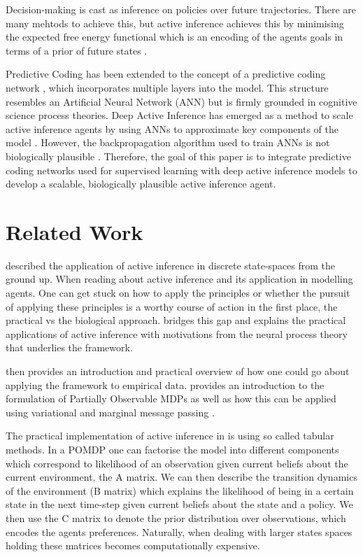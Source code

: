 \documentclass{article}
\begin{document}
Decision-making is cast as inference on policies over future trajectories. There are many mehtods to achieve this, but active inference achieves this by minimising the expected free energy functional which is an encoding of the agents goals in terms of a prior of future states \citep{friston2020relationship}. 

\vspace{1em}

Predictive Coding has been extended to the concept of a predictive coding network \citep{whittington2017approximation, bogacz2017tutorial, millidge2019implementing}, which incorporates multiple layers into the model. This structure resembles an Artificial Neural Network (ANN) but is firmly grounded in cognitive science process theories. Deep Active Inference has emerged as a method to scale active inference agents by using ANNs to approximate key components of the model \citep{millidge2020deep, fountas2020deep, himst2020deep}. However, the backpropagation algorithm used to train ANNs is not biologically plausible \citep{ororbia2024review}. Therefore, the goal of this paper is to integrate predictive coding networks used for supervised learning with deep active inference models to develop a scalable, biologically plausible active inference agent.

\section{Related Work}

\citet{dacosta2020active} described the application of active inference in discrete state-spaces from the ground up. When reading about active inference and its application in modelling agents. One can get stuck on how to apply the principles or whether the pursuit of applying these principles is a worthy course of action in the first place, the practical vs the biological approach. \citet{dacosta2020active} bridges this gap and explains the practical applications of active inference with motivations from the neural process theory that underlies the framework. 

\citet{smith2022} then provides an introduction and practical overview of how one could go about applying the framework to empirical data. \citet{smith2022} provides an introduction to the formulation of Partially Observable MDPs as well as how this can be applied using variational \citep{winn2005variational} and marginal message passing \citep{parr2019neuronal}.

The practical implementation of active inference in \citet{smith2022} is using so called tabular methods. In a POMDP one can factorise the model into different components which correspond to likelihood of an observation given current beliefs about the current environment, the A matrix. We can then describe the transition dynamics of the environment (B matrix) which explains the likelihood of being in a certain state in the next time-step given current beliefs about the state and a policy. We then use the C matrix to denote the prior distribution over observations, which encodes the agents preferences. Naturally, when dealing with larger states spaces holding these matrices becomes computationally expensive.
\end{document}
